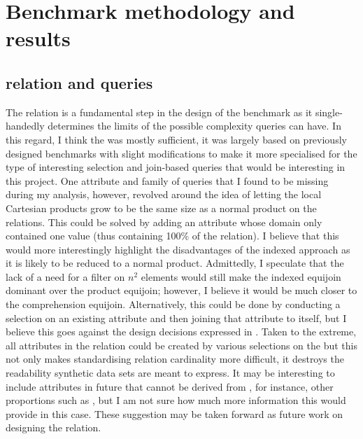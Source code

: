 \section{Benchmark methodology and results}
\subsection{ relation and queries}
The  relation is a fundamental step in the design of
the benchmark as it single-handedly determines the limits of the possible
complexity queries can have. In this regard, I think the  was mostly
sufficient, it was largely based on previously designed benchmarks with slight
modifications to make it more specialised for the type of interesting
selection and join-based queries that would be interesting in this project. One
attribute and family of queries that I found to be missing during my analysis,
however, revolved around the idea of letting the local Cartesian products grow
to be the same size as a normal product on the relations. This could be solved
by adding an attribute  whose domain only
contained one value (thus containing 100\% of the relation). I believe that this
would more interestingly highlight the disadvantages of the indexed approach as
it is likely to be reduced to a normal product. Admittedly, I speculate that the lack of a need
for a filter on $n^2$ elements would still make the indexed equijoin dominant
over the product equijoin; however, I believe it would be much closer to the
comprehension equijoin. Alternatively, this could be done by conducting a
selection on an existing attribute and then joining that attribute to itself,
but I believe this goes against the design decisions expressed in
. Taken to the extreme, all
attributes in the relation could be created by various selections on the
 but this not only makes standardising relation
cardinality more difficult, it destroys the readability synthetic data sets are
meant to express. It may be interesting to include attributes in future that
cannot be derived from , for instance, other
proportions such as , but I am not sure how much more
information this would provide in this case. These suggestion may be taken
forward as future work on designing the  relation.

